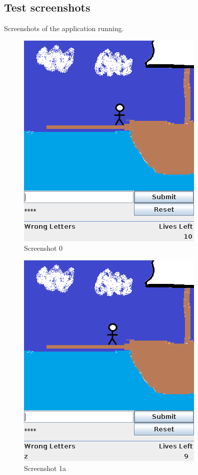 \documentclass[notitlepage]{report}
\begin{document}
\subsection{Test screenshots}
Screenshots of the application running. 
\begin{multicols}{2}

\begin{figure}[H]
\centering
\includegraphics[scale=0.5]{TestScreenshots/0}
\caption{Screenshot 0}
\end{figure}

\begin{figure}[H]
\centering
\includegraphics[scale=0.5]{TestScreenshots/1a}
\caption{Screenshot 1a}
\end{figure}


\end{multicols}
\end{document}
